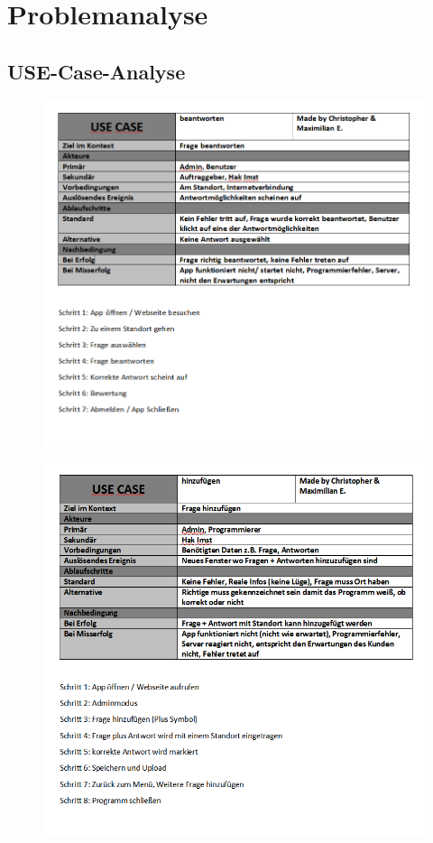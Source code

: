 \chapter{Problemanalyse}
\section{USE-Case-Analyse}


\begin{figure}
	\centering
	\includegraphics[width=1.2\linewidth]{screenshot010}
	\caption{}
	\label{fig:screenshot010}
\end{figure}


\begin{figure}
	\centering
	\includegraphics[width=1.2\linewidth]{screenshot011}
	\caption{}
	\label{fig:screenshot011}
\end{figure}


